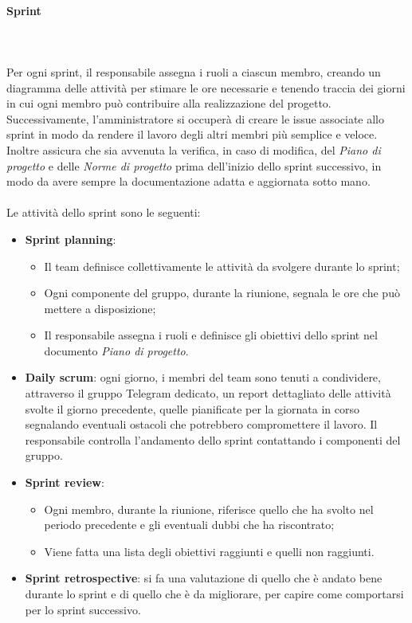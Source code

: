 \paragraph*{Sprint}\label{inf:sprint} ~\\\\ Per ogni sprint, il responsabile
assegna i ruoli a ciascun membro, creando un diagramma delle attività per
stimare le ore necessarie e tenendo traccia dei giorni in cui ogni membro può
contribuire alla realizzazione del progetto. Successivamente, l'amministratore
si occuperà di creare le issue associate allo sprint in modo da rendere il
lavoro degli altri membri più semplice e veloce. Inoltre assicura che sia
avvenuta la verifica, in caso di modifica, del \textit{Piano di progetto} e
delle \textit{Norme di progetto} prima dell'inizio dello sprint successivo, in
modo da avere sempre la documentazione adatta e aggiornata sotto mano.\\\\ Le
attività dello sprint sono le seguenti:
\begin{itemize}
    \item \textbf{Sprint planning}:
          \begin{itemize}
              \item Il team definisce collettivamente le attività da svolgere durante lo sprint;
              \item Ogni componente del gruppo, durante la riunione, segnala le ore che può mettere
                    a disposizione;
              \item Il responsabile assegna i ruoli e definisce gli obiettivi dello sprint nel
                    documento \textit{Piano di progetto}.
          \end{itemize}
    \item \textbf{Daily scrum}: ogni giorno, i membri del team sono tenuti a condividere, attraverso il gruppo Telegram dedicato,
          un report dettagliato delle attività svolte il giorno precedente,
          quelle pianificate per la giornata in corso segnalando eventuali ostacoli che potrebbero compromettere il lavoro.
          Il responsabile controlla l'andamento dello sprint contattando i componenti del gruppo.
    \item \textbf{Sprint review}:
          \begin{itemize}
              \item Ogni membro, durante la riunione, riferisce quello che ha svolto nel periodo
                    precedente e gli eventuali dubbi che ha riscontrato;
              \item Viene fatta una lista degli obiettivi raggiunti e quelli non raggiunti.
          \end{itemize}
    \item \textbf{Sprint retrospective}: si fa una valutazione di quello che è andato bene durante lo sprint e di
          quello che è da migliorare, per capire come comportarsi per lo sprint successivo.
\end{itemize}

